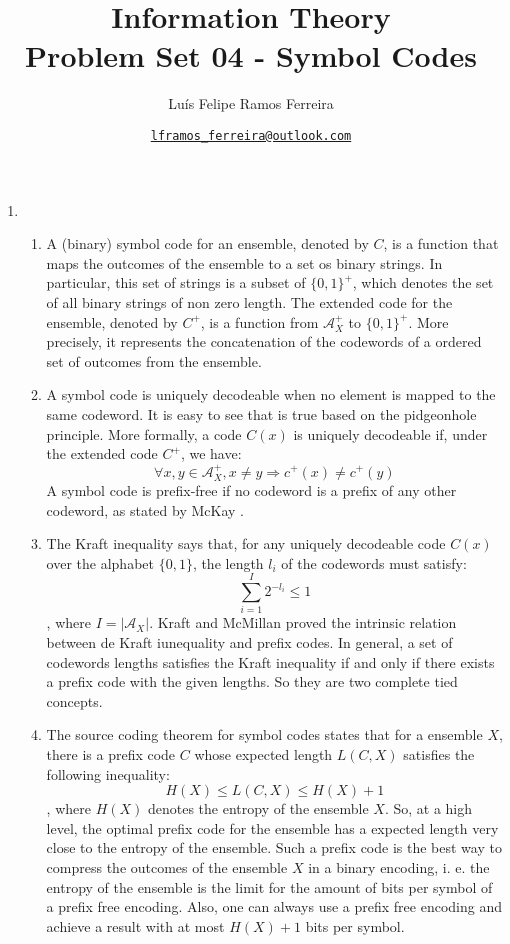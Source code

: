\documentclass{article}
\title{Information Theory \\ \large Problem Set 04 - Symbol Codes}
\author{Luís Felipe Ramos Ferreira}
\date{\href{mailto:lframos\_ferreira@outlook.com}{\texttt{lframos\_ferreira@outlook.com}}
}
\begin{document}
\maketitle

\begin{enumerate}
	\item \begin{enumerate}
		      \item A (binary) symbol code for an ensemble, denoted by \(C\), is a function that maps the outcomes of the ensemble to a set os binary strings. In particular, this set of strings is a subset of \(\{0, 1\}^+\), which denotes the set of all binary strings of non zero length. The extended code for the ensemble, denoted by \(C^+\), is a function from \(\mathcal{A}_X^+\) to \(\{0, 1\}^+\). More precisely, it represents the concatenation of the codewords of a ordered set of outcomes from the ensemble.
		      \item A symbol code is uniquely decodeable when no element is mapped to the same codeword. It is easy to see that is true based on the pidgeonhole principle. More formally, a code \(C(x)\) is uniquely decodeable if, under the extended code \(C^+\), we have:
		            \[\forall x, y \in \mathcal{A}_X^+, x \neq y \Rightarrow c^+(x) \neq c^+(y)\]
		            A symbol code is prefix-free if no codeword is a prefix of any other codeword, as stated by McKay \cite{MacKay}.
		      \item The Kraft inequality says that, for any uniquely decodeable code \(C(x)\) over the alphabet \(\{0,1\}\), the length \(l_i\) of the codewords must satisfy:
		            \[\sum_{i=1}^{I}2^{-l_i} \leq 1\],
		            where \(I = |\mathcal{A}_X|\).
		            Kraft and McMillan proved the intrinsic relation between de Kraft iunequality and prefix codes. In general, a set of codewords lengths satisfies the Kraft inequality if and only if there exists a prefix code with the given lengths. So they are two complete tied concepts.
		      \item The source coding theorem for symbol codes states that for a ensemble \(X\), there is a prefix code \(C\) whose expected length \(L(C, X)\) satisfies the following inequality:
		            \[H(X) \leq L(C, X) \leq H(X) + 1\],
		            where \(H(X)\) denotes the entropy of the ensemble \(X\).
		            So, at a high level, the optimal prefix code for the ensemble has a expected length very close to the entropy of the ensemble. Such a prefix code is the best way to compress the outcomes of the ensemble \(X\) in a binary encoding, i. e. the entropy of the ensemble is the limit for the amount of bits per symbol of a prefix free encoding. Also, one can always use a prefix free encoding and achieve a result with at most \(H(X) + 1\) bits per symbol.
	      \end{enumerate}


\end{enumerate}
\end{document}
